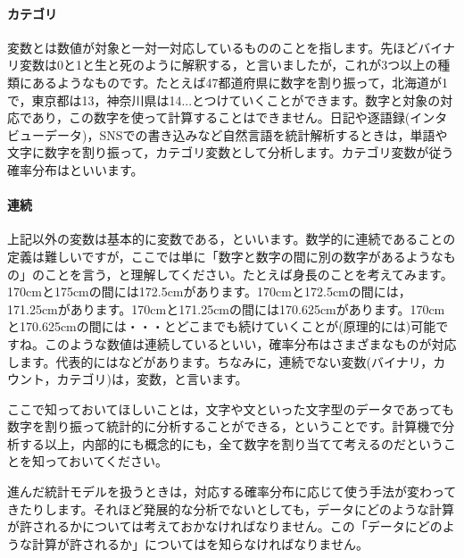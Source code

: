 \documentclass{ltjsbook}
\begin{document}
\paragraph{カテゴリ}
変数とは数値が対象と一対一対応しているもののことを指します。先ほどバイナリ変数は0と1と生と死のように解釈する，と言いましたが，これが3つ以上の種類にあるようなものです。たとえば47都道府県に数字を割り振って，北海道が1で，東京都は13，神奈川県は14...とつけていくことができます。数字と対象の対応であり，この数字を使って計算することはできません。日記や逐語録(インタビューデータ)，SNSでの書き込みなど自然言語を統計解析するときは，単語や文字に数字を割り振って，カテゴリ変数として分析します。カテゴリ変数が従う確率分布はといいます。
\paragraph{連続}
上記以外の変数は基本的に変数である，といいます。数学的に連続であることの定義は難しいですが，ここでは単に「数字と数字の間に別の数字があるようなもの」のことを言う，と理解してください。たとえば身長のことを考えてみます。170cmと175cmの間には172.5cmがあります。170cmと172.5cmの間には，171.25cmがあります。170cmと171.25cmの間には170.625cmがあります。170cmと170.625cmの間には・・・とどこまでも続けていくことが(原理的には)可能ですね。このような数値は連続しているといい，確率分布はさまざまなものが対応します。代表的にはなどがあります。ちなみに，連続でない変数(バイナリ，カウント，カテゴリ)は，変数，と言います。

ここで知っておいてほしいことは，文字や文といった文字型のデータであっても数字を割り振って統計的に分析することができる，ということです。計算機で分析する以上，内部的にも概念的にも，全て数字を割り当てて考えるのだということを知っておいてください。

進んだ統計モデルを扱うときは，対応する確率分布に応じて使う手法が変わってきたりします。それほど発展的な分析でないとしても，データにどのような計算が許されるかについては考えておかなければなりません。この「データにどのような計算が許されるか」についてはを知らなければなりません。
\end{document}

